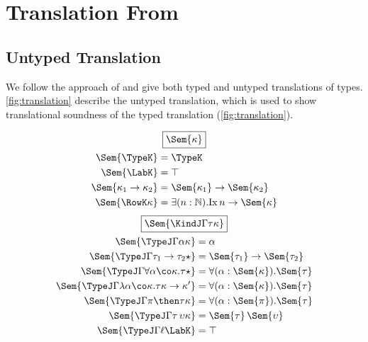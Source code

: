 \documentclass[authoryear,acmsmall,screen]{acmart}
\newcommand\Nat{\mathbb{N}}
\newcommand\Ix[1]{\mathrm{Ix} \, #1}
\newcommand\Ixed[1]{\ensuremath{\Sem{#1}}}
\begin{document}
\section{Translation From \RO}

\subsection{Untyped Translation}

We follow the approach of \cite{MorrisM19} and give both typed and untyped translations of \RO types. \cref{fig:translation} describe the untyped translation, which is used to show translational soundness of the typed translation (\cref{fig:translation}).


\begin{figure}[H]
\begin{gather*}
\fbox{$\Ixed{\kappa}$} \\
\begin{align*}
\vspace{5em}
\Ixed{\TypeK} &= \TypeK \\
\Ixed{\LabK} &= \top \\
\Ixed{\kappa_1 \to \kappa_2} &= \Ixed{\kappa_1} \to \Ixed{\kappa_2} \\
\Ixed{\RowK \kappa} &= \exists(n : \Nat). \Ix  n \to \Ixed{\kappa} \\
\end{align*}
\end{gather*}
\begin{gather*}
\fbox{$\Ixed{\KindJ \Gamma \tau \kappa}$} \\
\begin{align*}
\vspace{5em}
\Ixed{\TypeJ \Gamma \alpha \kappa} &= \alpha \\
\Ixed{\TypeJ \Gamma {\tau_1 \to \tau_2} \star} &= \Ixed{\tau_1} \to \Ixed{\tau_2} \\
\Ixed{\TypeJ \Gamma {\forall \alpha \co \kappa. \tau} \star} &= \forall (\alpha : \Ixed{\kappa}).\Ixed{\tau} \\
\Ixed{\TypeJ \Gamma {\lambda \alpha \co \kappa. \tau} {\kappa \to \kappa'}} &= \forall (\alpha : \Ixed{\kappa}).\Ixed{\tau} \\
\Ixed{\TypeJ \Gamma {\pi \then \tau} \kappa} &= \forall (\alpha : \Ixed{\pi}). \Ixed{\tau} \\
\Ixed{\TypeJ \Gamma {\tau \, \upsilon} \kappa} &= \Ixed{\tau} \, \Ixed{\upsilon} \\
\Ixed{\TypeJ \Gamma \ell {\LabK}} &= \top  \\

\end{align*}
\end{gather*}
\end{figure}
\end{document}
